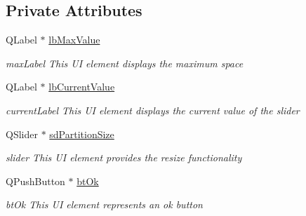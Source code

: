 \subsection*{Private Attributes}
\begin{DoxyCompactItemize}
\item 
\mbox{\label{classui_1_1window_1_1_resize_partition_ad167e56b7a434144ff8d74b82032eaaa}} 
Q\+Label $\ast$ \mbox{\hyperlink{classui_1_1window_1_1_resize_partition_ad167e56b7a434144ff8d74b82032eaaa}{lb\+Max\+Value}}
\begin{DoxyCompactList}\small\item\em max\+Label This UI element displays the maximum space \end{DoxyCompactList}\item 
\mbox{\label{classui_1_1window_1_1_resize_partition_ac6bc04608307e6209a7fbf061b02dfe6}} 
Q\+Label $\ast$ \mbox{\hyperlink{classui_1_1window_1_1_resize_partition_ac6bc04608307e6209a7fbf061b02dfe6}{lb\+Current\+Value}}
\begin{DoxyCompactList}\small\item\em current\+Label This UI element displays the current value of the slider \end{DoxyCompactList}\item 
\mbox{\label{classui_1_1window_1_1_resize_partition_aa3eacbce4b79f497f9baebdcda9fcf9d}} 
Q\+Slider $\ast$ \mbox{\hyperlink{classui_1_1window_1_1_resize_partition_aa3eacbce4b79f497f9baebdcda9fcf9d}{sd\+Partition\+Size}}
\begin{DoxyCompactList}\small\item\em slider This UI element provides the resize functionality \end{DoxyCompactList}\item 
\mbox{\label{classui_1_1window_1_1_resize_partition_a8098de513ac511197d124937271850c7}} 
Q\+Push\+Button $\ast$ \mbox{\hyperlink{classui_1_1window_1_1_resize_partition_a8098de513ac511197d124937271850c7}{bt\+Ok}}
\begin{DoxyCompactList}\small\item\em bt\+Ok This UI element represents an ok button \end{DoxyCompactList}\item 

\end{DoxyCompactItemize}
